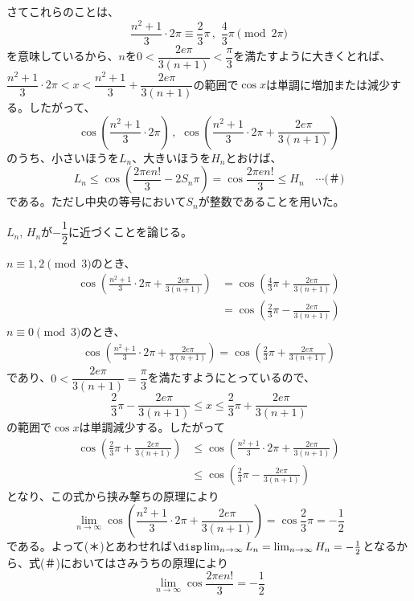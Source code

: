 さてこれらのことは、
\[ \frac{n^2+1}{3}\cdot 2\pi \equiv \frac{2}{3}\pi \,,\,\, \frac{4}{3}\pi \pmod{2\pi} \]
を意味しているから、$n$を$0<\dfrac{2e\pi}{3(n+1)}<\dfrac{\pi}{3}$を満たすように大きくとれば、$\dfrac{n^2+1}{3}\cdot 2\pi<x<\dfrac{n^2+1}{3}+\dfrac{2e\pi}{3(n+1)}$の範囲で$\cos x$は単調に増加または減少する。したがって、
\[ \cos\left(\frac{n^2+1}{3}\cdot 2\pi\right) \,,\,\, \cos\left(\frac{n^2+1}{3}\cdot 2\pi+\frac{2e\pi}{3(n+1)}\right) \]
のうち、小さいほうを$L_n$、大きいほうを$H_n$とおけば、
\[ L_n \le \cos\left(\frac{2\pi e n!}{3}-2S_n\pi\right)=\cos\frac{2\pi e n!}{3} \le H_n \quad\cdots\text{(＃)} \]
である。ただし中央の等号において$S_n$が整数であることを用いた。

$L_n$, $H_n$が$-\dfrac{1}{2}$に近づくことを論じる。

$n\equiv 1, 2 \pmod{3}$のとき、
\begin{align*}
 \cos\left(\frac{n^2+1}{3}\cdot 2\pi+\frac{2e\pi}{3(n+1)}\right)&=\cos\left(\frac{4}{3}\pi+\frac{2e\pi}{3(n+1)}\right) \\
 &=\cos\left(\frac{2}{3}\pi-\frac{2e\pi}{3(n+1)}\right)
\end{align*}
$n\equiv 0 \pmod{3}$のとき、
\begin{align*}
 \cos\left(\frac{n^2+1}{3}\cdot 2\pi+\frac{2e\pi}{3(n+1)}\right)=\cos\left(\frac{2}{3}\pi+\frac{2e\pi}{3(n+1)}\right)
\end{align*}
であり、$0<\dfrac{2e\pi}{3(n+1)}=\dfrac{\pi}{3}$を満たすようにとっているので、
\[ \dfrac{2}{3}\pi-\dfrac{2e\pi}{3(n+1)}\le x\le \dfrac{2}{3}\pi+\dfrac{2e\pi}{3(n+1)} \]
の範囲で$\cos x$は単調減少する。したがって
\begin{align*}
 \cos\left(\frac{2}{3}\pi+\frac{2e\pi}{3(n+1)}\right)&\le \cos\left(\frac{n^2+1}{3}\cdot 2\pi+\frac{2e\pi}{3(n+1)}\right) \\
 &\le \cos\left(\frac{2}{3}\pi-\frac{2e\pi}{3(n+1)}\right)
\end{align*}
となり、この式から挟み撃ちの原理により
\[ \lim_{n\to\infty}\cos\left(\frac{n^2+1}{3}\cdot 2\pi+\frac{2e\pi}{3(n+1)}\right)=\cos\frac{2}{3}\pi=-\frac{1}{2} \]
である。よって(＊)とあわせれば$\disp \lim_{n\to\infty}L_n=\lim_{n\to\infty}H_n=-\frac{1}{2}$となるから、式(＃)においてはさみうちの原理により
\[ \lim_{n\to\infty} \cos\frac{2\pi e n!}{3}=-\frac{1}{2} \]